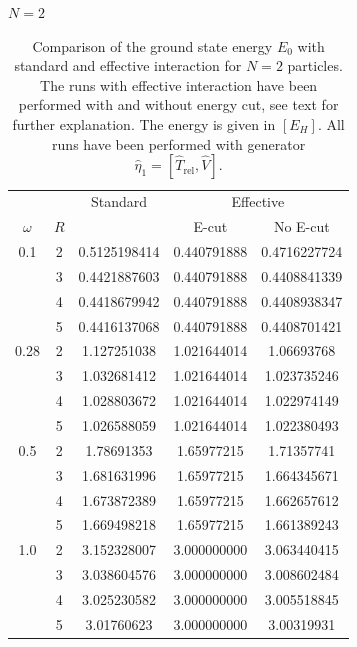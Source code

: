 \begin{table}
\begin{center}
$N = 2$ \\
\vspace{3pt}
\begin{tabular}{c|cccc}
\hline\hline
 & &Standard  &\multicolumn{2}{c}{Effective}\\
$\omega$ &$R$ & & E-cut& No E-cut \\
\hline
 \hline   
   0.1    & 2 &  0.5125198414    &  0.440791888  & 0.4716227724  \\
          & 3 &  0.4421887603    & 0.440791888 & 0.4408841339    \\
          & 4 & 0.4418679942     & 0.440791888   &  0.4408938347   \\
          & 5 & 0.4416137068     & 0.440791888  &  0.4408701421     \\
 \hline      
   0.28   & 2 &  1.127251038    & 1.021644014  &  1.06693768    \\
          & 3 & 1.032681412     & 1.021644014   &  1.023735246  \\
          & 4 & 1.028803672     & 1.021644014  &  1.022974149          \\
          & 5 & 1.026588059     & 1.021644014    &  1.022380493       \\ 
 \hline  
   0.5   & 2 & 1.78691353      & 1.65977215&  1.71357741  \\
          & 3 & 1.681631996    & 1.65977215  &  1.664345671   \\
          & 4 & 1.673872389    & 1.65977215  &  1.662657612     \\
          & 5 & 1.669498218    & 1.65977215   & 1.661389243      \\
 \hline   
   1.0    & 2 & 3.152328007    & 3.000000000  &  3.063440415   \\
          & 3 &  3.038604576 & 3.000000000&  3.008602484   \\
          & 4 &  3.025230582   &  3.000000000  & 3.005518845      \\
          & 5 &  3.01760623    &  3.000000000   & 3.00319931    \\ 
 \hline \hline
\end{tabular}
\end{center}
\caption{Comparison of the ground state energy $E_0$ with standard and effective interaction for $N=2$ particles. The runs with effective interaction have been performed with and without energy cut, see text for further explanation. The energy is given in $[E_H]$.
  All runs have been performed with generator $\hat{\eta}_1 = \left[ \hat{T}_{\text{rel}}, \hat{V}\right]$.}
\label{tab:EffInt}
\end{table}


